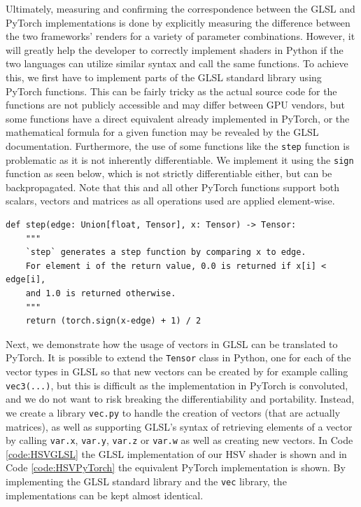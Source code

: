 Ultimately, measuring and confirming the correspondence between the GLSL and PyTorch implementations is done by explicitly measuring the difference between the two frameworks' renders for a variety of parameter combinations. However, it will greatly help the developer to correctly implement shaders in Python if the two languages can utilize similar syntax and call the same functions. To achieve this, we first have to implement parts of the GLSL standard library using PyTorch functions. This can be fairly tricky as the actual source code for the functions are not publicly accessible and may differ between GPU vendors, but some functions have a direct equivalent already implemented in PyTorch, or the mathematical formula for a given function may be revealed by the GLSL documentation. Furthermore, the use of some functions like the \texttt{step} function is problematic as it is not inherently differentiable. We implement it using the \texttt{sign} function as seen below, which is not strictly differentiable either, but can be backpropagated. Note that this and all other PyTorch functions support both scalars, vectors and matrices as all operations used are applied element-wise.

\begin{verbatim}
def step(edge: Union[float, Tensor], x: Tensor) -> Tensor:
    """
    `step` generates a step function by comparing x to edge.
    For element i of the return value, 0.0 is returned if x[i] < edge[i], 
    and 1.0 is returned otherwise.
    """
    return (torch.sign(x-edge) + 1) / 2
\end{verbatim}

Next, we demonstrate how the usage of vectors in GLSL can be translated to PyTorch. It is possible to extend the \texttt{Tensor} class in Python, one for each of the vector types in GLSL so that new vectors can be created by for example calling \texttt{vec3(...)}, but this is difficult as the implementation in PyTorch is convoluted, and we do not want to risk breaking the differentiability and portability. Instead, we create a library \texttt{vec.py} to handle the creation of vectors (that are actually matrices), as well as supporting GLSL's syntax of retrieving elements of a vector by calling \texttt{var.x}, \texttt{var.y}, \texttt{var.z} or \texttt{var.w} as well as creating new vectors. In Code \ref{code:HSVGLSL} the GLSL implementation of our HSV shader is shown and in Code \ref{code:HSVPyTorch} the equivalent PyTorch implementation is shown. By implementing the GLSL standard library and the \texttt{vec} library, the implementations can be kept almost identical.

